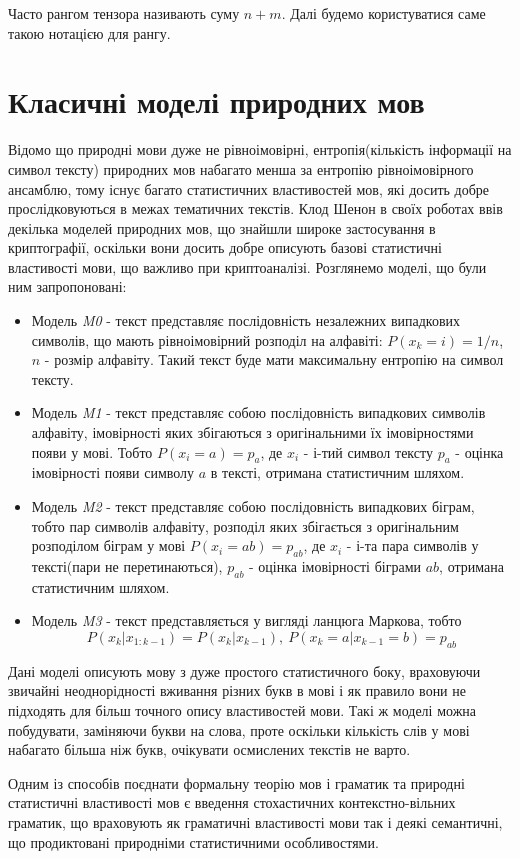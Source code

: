 Часто рангом тензора називають суму $n+m$. Далі будемо користуватися саме такою нотацією для рангу.
\section{Класичні моделі природних мов}
Відомо що природні мови дуже не рівноімовірні, ентропія(кількість інформації на символ тексту) природних мов набагато менша за ентропію рівноімовірного ансамблю, тому існує багато статистичних властивостей мов, які досить добре прослідковуються в межах тематичних текстів.
Клод Шенон в своїх роботах ввів декілька моделей природних мов, що знайшли широке застосування в криптографії, оскільки вони досить добре описують базові статистичні властивості мови, що важливо при криптоаналізі. Розглянемо моделі, що були ним запропоновані:
\begin{itemize}
  \item Модель \textit{M0} - текст представляє послідовність незалежних випадкових символів, що мають рівноімовірний розподіл на алфавіті: $P(x_k = i) = 1/n$, $n$ - розмір алфавіту. Такий текст буде мати максимальну ентропію на символ тексту.
  \item Модель \textit{M1} - текст представляє собою послідовність випадкових символів алфавіту, імовірності яких збігаються з оригінальними їх імовірностями появи у мові. Тобто $ P(x_i = a) = p_a $, де $x_i$ - і-тий символ тексту $p_a$ - оцінка імовірності появи символу $a$ в тексті, отримана статистичним шляхом.
  \item Модель \textit{M2} - текст представляє собою послідовність випадкових біграм, тобто пар символів алфавіту, розподіл яких збігається з оригінальним розподілом біграм у мові $ P(x_i = ab) = p_{ab} $, де $x_i$ - і-та пара символів у тексті(пари не перетинаються), $p_{ab}$ - оцінка імовірності біграми $ab$, отримана статистичним шляхом.
  \item Модель \textit{M3} - текст представляється у вигляді ланцюга Маркова, тобто
  $$ P(x_k | x_{1:k-1}) = P(x_k | x_{k-1}),\ P(x_k = a | x_{k-1} = b) = p_{ab} $$
\end{itemize}
Дані моделі описують мову з дуже простого статистичного боку, враховуючи звичайні неоднорідності вживання різних букв в мові і як правило вони не підходять для більш точного
опису властивостей мови. Такі ж моделі можна побудувати, заміняючи букви на слова, проте оскільки кількість слів у мові набагато більша ніж букв, очікувати осмислених текстів не варто.

Одним із способів поєднати формальну теорію мов і граматик та природні статистичні властивості мов є введення стохастичних контекстно-вільних граматик, що враховують як граматичні властивості мови так і деякі семантичні, що продиктовані природніми статистичними особливостями.
